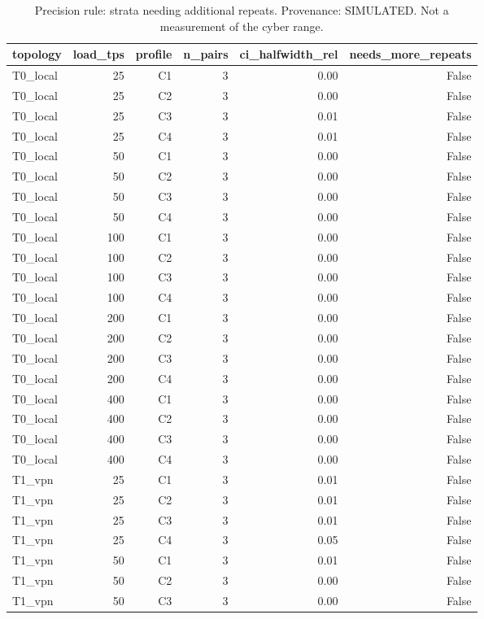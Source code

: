 \begin{table}[t]
\caption{Precision rule: strata needing additional repeats. Provenance: SIMULATED.  Not a measurement of the cyber range.}
\label{tab:table_precision_check}
\centering
\begin{tabular}{lrrrrr}
\hline
topology & load\_tps & profile & n\_pairs & ci\_halfwidth\_rel & needs\_more\_repeats \\
\hline
T0\_local & 25 & C1 & 3 & 0.00 & False \\
T0\_local & 25 & C2 & 3 & 0.00 & False \\
T0\_local & 25 & C3 & 3 & 0.01 & False \\
T0\_local & 25 & C4 & 3 & 0.01 & False \\
T0\_local & 50 & C1 & 3 & 0.00 & False \\
T0\_local & 50 & C2 & 3 & 0.00 & False \\
T0\_local & 50 & C3 & 3 & 0.00 & False \\
T0\_local & 50 & C4 & 3 & 0.00 & False \\
T0\_local & 100 & C1 & 3 & 0.00 & False \\
T0\_local & 100 & C2 & 3 & 0.00 & False \\
T0\_local & 100 & C3 & 3 & 0.00 & False \\
T0\_local & 100 & C4 & 3 & 0.00 & False \\
T0\_local & 200 & C1 & 3 & 0.00 & False \\
T0\_local & 200 & C2 & 3 & 0.00 & False \\
T0\_local & 200 & C3 & 3 & 0.00 & False \\
T0\_local & 200 & C4 & 3 & 0.00 & False \\
T0\_local & 400 & C1 & 3 & 0.00 & False \\
T0\_local & 400 & C2 & 3 & 0.00 & False \\
T0\_local & 400 & C3 & 3 & 0.00 & False \\
T0\_local & 400 & C4 & 3 & 0.00 & False \\
T1\_vpn & 25 & C1 & 3 & 0.01 & False \\
T1\_vpn & 25 & C2 & 3 & 0.01 & False \\
T1\_vpn & 25 & C3 & 3 & 0.01 & False \\
T1\_vpn & 25 & C4 & 3 & 0.05 & False \\
T1\_vpn & 50 & C1 & 3 & 0.01 & False \\
T1\_vpn & 50 & C2 & 3 & 0.00 & False \\
T1\_vpn & 50 & C3 & 3 & 0.00 & False \\

\end{tabular}
\end{table}

